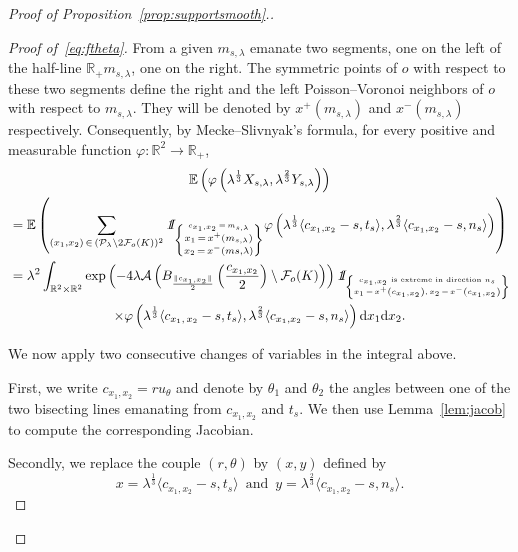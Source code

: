 \documentclass[AHL,Unicode,longabstracts,published]{cedram}
\newcommand{\indicat}{{\text{1}}\negthickspace\text{I}}
\newcommand{\cA}{\mathcal{A}}
\newcommand{\cF}{\mathcal{F}}
\newcommand{\cP}{\mathcal{P}}
\newcommand{\dd}{\mathrm{d}}
\newcommand{\E}{\mathbb{E}}
\newcommand{\R}{\mathbb{R}}
\newcommand{\pass}{\vspace{0.3cm}\noindent}
\newcommand{\noi}{\noindent}
\newenvironment*{prooff}{\begin{proof}}{\let\qed\relax\end{proof}}
\newcommand{\R}{\mathbb{R}}
\begin{document}
\begin{proof}[{Proof of Proposition~\ref{prop:supportsmooth}.}]
\begin{prooff}[{Proof of~\eqref{eq:ftheta}}]
From a given $m_{s,\lambda}$ emanate two segments, one on the left of the half-line $\R_+m_{s,\lambda}$, one on the right. The symmetric points of $o$ with respect to these two segments define the right and the left Poisson--Voronoi neighbors of $o$ with respect to $m_{s,\lambda}$. They will be denoted by $x^+(m_{s,\lambda})$ and $x^-(m_{s,\lambda})$ respectively. Consequently, by Mecke--Slivnyak's formula, for every positive and measurable function $\varphi:\R^2\longrightarrow \R_+$,
\begin{multline*}\label{eq:convloi}
\E\left(\varphi\left(\lambda^{\frac1{3}}X_{s,\lambda},\lambda^{\frac{2}{3}}Y_{s,\lambda}\right)\right) \\
\begin{aligned}
& = \E\left(\sum_{(x_1,x_2)\,\in\,(\cP_{\lambda}\setminus2\cF_o(K))^2} {\emph{\indicat}}_{\left\{\substack{\scriptscriptstyle c_{x_1,x_2}\,=\,m_{s,\lambda}\\
x_1\,=\,x^+(m_{s,\lambda})\\x_2\,=\,x^-(m{s,\lambda})}\right\}}
\varphi\left(\lambda^{\frac1{3}}\langle c_{x_1,x_2}-s,t_s\rangle,\lambda^{\frac{2}{3}}\langle c_{x_1,x_2}-s,n_s\rangle\right)\right) \\
& = \lambda^2\int_{\R^2\times\R^2}\exp\left(-4\lambda\cA\left(B_{\frac{\|c_{x_1,x_2}\|}{2}}\left(\frac{c_{x_1,x_2}}{2}\right)\setminus\cF_o(K)\right)\right) {\emph{\indicat}}_{\left\{
\substack{\scriptscriptstyle{c_{x_1,x_2}\text{ is extreme in direction }n_s}\\
\scriptscriptstyle{x_1\,=\,x^+\left(c_{x_1,x_2}\right),\, x_2\,=\,x^-\left(c_{x_1,x_2}\right)}}
\right\}}
\end{aligned}\\
\times\varphi\left(\lambda^{\frac{1}{3}}\langle c_{x_1,\,x_2}-s,t_s\rangle,\lambda^{\frac{2}{3}}\langle c_{x_1,x_2}-s,n_s\rangle\right)\dd x_1 \dd x_2.
\end{multline*}

We now apply two consecutive changes of variables in the integral above.

First, we write $c_{x_1,x_2}= ru_{\theta}$ and denote by $\theta_1$ and $\theta_2$ the angles between one of the two bisecting lines emanating from $c_{x_1,x_2}$ and $t_{s}$. We then use Lemma~\ref{lem:jacob} to compute the corresponding Jacobian.

Secondly, we replace the couple $(r,\theta)$ by $(x,y)$ defined by
\begin{equation*}\label{eq:xyh}
x=\lambda^{\frac1{3}}\langle c_{x_1,x_2}-s,t_s\rangle\,\text{ and }\, y=\lambda^{\frac{2}{3}}\langle c_{x_1,x_2}-s,n_s\rangle.
\end{equation*}


\end{prooff}
\end{proof}
\end{document}

